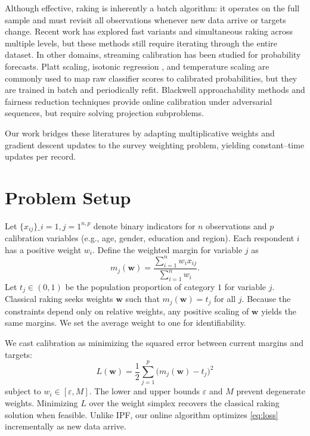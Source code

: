 \documentclass[12pt, letterpaper]{article}
\begin{document}
Although effective, raking is inherently a batch algorithm: it operates
on the full sample and must revisit all observations whenever new data
arrive or targets change.  Recent work has explored fast variants and
simultaneous raking across multiple levels\citep{Kolenikov2015}, but
these methods still require iterating through the entire dataset.  In
other domains, streaming calibration has been studied for probability
forecasts.  Platt scaling\citep{Platt1999}, isotonic regression
\citep{Zadrozny2002}, and temperature scaling\citep{Guo2017} are
commonly used to map raw classifier scores to calibrated probabilities,
but they are trained in batch and periodically refit.  Blackwell
approachability methods\citep{Foster2018} and fairness reduction
techniques\citep{Agarwal2018} provide online calibration under
adversarial sequences, but require solving projection subproblems.

Our work bridges these literatures by adapting multiplicative weights
and gradient descent updates to the survey weighting problem, yielding
constant--time updates per record.

\section{Problem Setup}
\label{sec:setup}

Let \(\{x_{ij}\}\_{i=1,j=1}^{n,p}\) denote binary indicators for \(n\)
observations and \(p\) calibration variables (e.g., age, gender, education
and region).  Each respondent \(i\) has a positive weight \(w_i\).
Define the weighted margin for variable \(j\) as
\[
  m_j(\mathbf{w}) = \frac{\sum_{i=1}^n w_i x_{ij}}{\sum_{i=1}^n w_i}.
\]
Let \(t_j\in (0,1)\) be the population proportion of category \(1\) for
variable \(j\).  Classical raking seeks weights \(\mathbf{w}\) such that
\(m_j(\mathbf{w}) = t_j\) for all \(j\).  Because the constraints depend
only on relative weights, any positive scaling of \(\mathbf{w}\) yields
the same margins.  We set the average weight to one for identifiability.

We cast calibration as minimizing the squared error between current
margins and targets:
\begin{equation}
  L(\mathbf{w}) = \frac{1}{2} \sum_{j=1}^p \bigl(m_j(\mathbf{w}) - t_j\bigr)^2
  \label{eq:loss}
\end{equation}
subject to \(w_i \in [\varepsilon, M]\).  The lower and upper bounds
\(\varepsilon\) and \(M\) prevent degenerate weights.  Minimizing
\(L\) over the weight simplex recovers the classical raking solution
when feasible.  Unlike IPF, our online algorithm optimizes \eqref{eq:loss}
incrementally as new data arrive.
\end{document}
